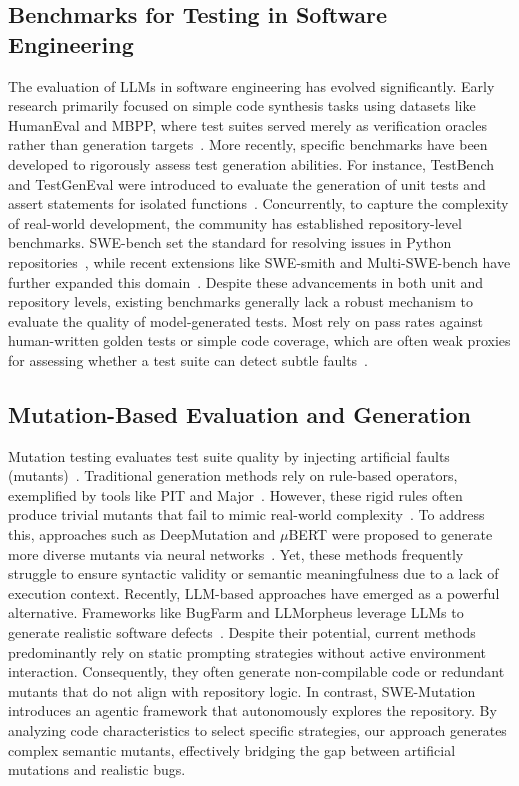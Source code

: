 \documentclass[11pt]{article}
\begin{document}
\subsection{Benchmarks for Testing in Software Engineering}
The evaluation of LLMs in software engineering has evolved significantly. Early research primarily focused on simple code synthesis tasks using datasets like HumanEval and MBPP, where test suites served merely as verification oracles rather than generation targets~\citep{chen2021evaluating, austin2021program}. 
More recently, specific benchmarks have been developed to rigorously assess test generation abilities. For instance, TestBench and TestGenEval were introduced to evaluate the generation of unit tests and assert statements for isolated functions~\citep{zhang2025testbench, jain2025testgeneval}. 
Concurrently, to capture the complexity of real-world development, the community has established repository-level benchmarks. SWE-bench set the standard for resolving issues in Python repositories~\citep{jimenez2024swebench}, while recent extensions like SWE-smith and Multi-SWE-bench have further expanded this domain~\citep{yang2025swesmith, zan2025multiswebench}.
Despite these advancements in both unit and repository levels, existing benchmarks generally lack a robust mechanism to evaluate the quality of model-generated tests. Most rely on pass rates against human-written golden tests or simple code coverage, which are often weak proxies for assessing whether a test suite can detect subtle faults~\citep{wang2025mutation}.

\subsection{Mutation-Based Evaluation and Generation}
Mutation testing evaluates test suite quality by injecting artificial faults (mutants)~\citep{papadakis2019mutation}. Traditional generation methods rely on rule-based operators, exemplified by tools like PIT and Major~\citep{coles2016pit, just2014major}. However, these rigid rules often produce trivial mutants that fail to mimic real-world complexity~\citep{just2014mutants}. To address this, approaches such as DeepMutation and $\mu$BERT were proposed to generate more diverse mutants via neural networks~\citep{tufano2020deepmutation, degiovanni2022mubert}. Yet, these methods frequently struggle to ensure syntactic validity or semantic meaningfulness due to a lack of execution context.
Recently, LLM-based approaches have emerged as a powerful alternative. Frameworks like BugFarm and LLMorpheus leverage LLMs to generate realistic software defects~\citep{ibrahimzada2025challenging, tip2025llmorpheus}. Despite their potential, current methods predominantly rely on static prompting strategies without active environment interaction. Consequently, they often generate non-compilable code or redundant mutants that do not align with repository logic. In contrast, SWE-Mutation introduces an agentic framework that autonomously explores the repository. By analyzing code characteristics to select specific strategies, our approach generates complex semantic mutants, effectively bridging the gap between artificial mutations and realistic bugs.
\end{document}
